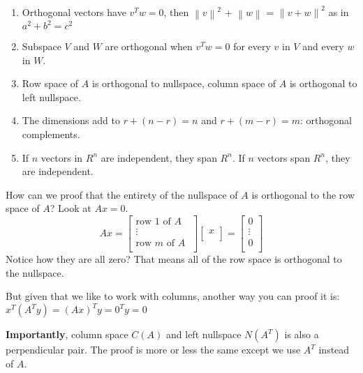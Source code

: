 \begin{enumerate}
    \item Orthogonal vectors have \(v^{T}w = 0\), then \(\left\lVert v \right\lVert^2\) + \(\left\lVert w \right\lVert\) = \(\left\lVert v + w \right\lVert^2\) as in \(a^2 + b^2 = c^2\)
    \item Subspace \(V\) and \(W\) are orthogonal when \(v^{T}w = 0\) for every \(v\) in \(V\) and every \(w\) in \(W\). 
    \item Row space of \(A\) is orthogonal to nullspace, column space of \(A\) is orthogonal to left nullspace.    
    \item The dimensions add to \(r + (n - r) = n\) and \(r + (m - r) = m\): orthogonal complements. 
    \item If \(n\) vectors in \(R^n\) are independent, they span \(R^n\). If \(n\) vectors span \(R^n\), they are independent.                 
\end{enumerate}

How can we proof that the entirety of the nullspace of \(A\) is orthogonal to the row space of \(A\)? Look at \(Ax = 0\). 
\[
    Ax = 
    \begin{bmatrix}
         \text{row 1 of \(A\) } \\
         \vdots \\
         \text{row $m$ of $A$} \\
    \end{bmatrix}
    \begin{bmatrix}
         x \\
    \end{bmatrix}
    =
    \begin{bmatrix}
         0 \\
         \vdots \\
         0 \\
    \end{bmatrix}
\]  
Notice how they are all zero? That means all of the row space is orthogonal to the nullspace. 

But given that we like to work with columns, another way you can proof it is: \( x^{T}(A^{T}y) = (Ax)^{T}y = 0^{T}y = 0 \)

\textbf{Importantly}, column space \(C(A)\) and left nullspace \(N(A^T)\) is also a perpendicular pair. The proof is more or less the same except we use \(A^T\) instead of \(A\). 

